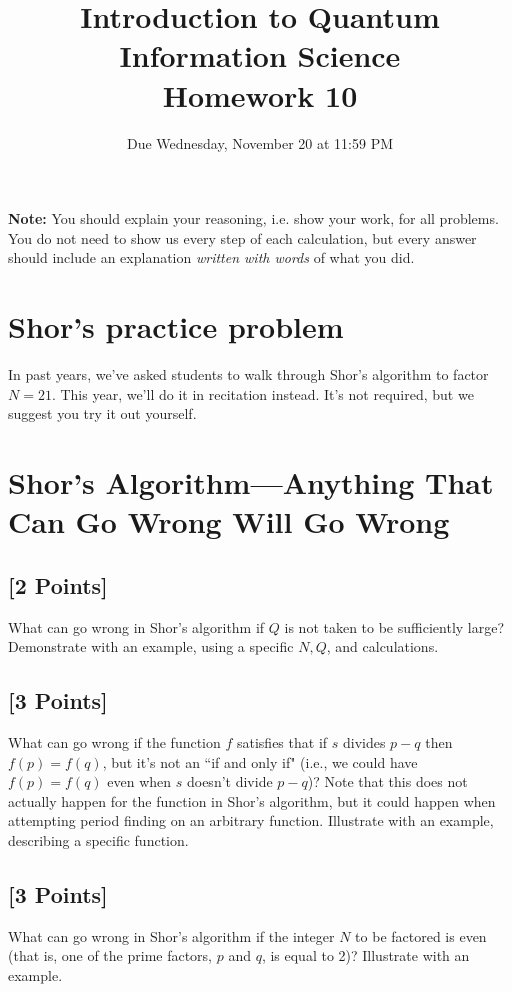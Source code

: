 \documentclass[11pt]{article}
\providecommand{\due}{Due Wednesday, November 20 at 11:59 PM}
\begin{document}
\title{Introduction to Quantum Information Science\\Homework 10}
\date{\due}

\maketitle

\textbf{Note:} You should explain your reasoning, i.e. show your work, for all problems. You do not need to show us every step of each calculation, but every answer should include an explanation \emph{written with words} of what you did.

\section*{Shor's practice problem}
In past years, we've asked students to walk through Shor's algorithm to factor $N=21$. This year, we'll do it in recitation instead. It's not required, but we suggest you try it out yourself.






\section{Shor's Algorithm---Anything That Can Go Wrong Will Go Wrong}

\subsection{[2 Points]} What can go wrong in Shor's algorithm if $Q$ is not taken to be
sufficiently large?  Demonstrate with an example, using a specific $N, Q$, and calculations.



\subsection{[3 Points]} What can go wrong if the function $f$
satisfies that if $s$ divides $p-q$ then $f(p)=f(q)$, but it's not an ``if and only if"
(i.e., we could have $f(p)=f(q)$ even when $s$ doesn't divide $p-q$)? Note that this does not actually happen for the function in Shor's algorithm, but it could happen when attempting period finding on an arbitrary function. Illustrate with an example, describing a specific function.



\subsection{[3 Points]} What can go wrong in Shor's algorithm if the integer $N$ to be factored is even (that is, one of the prime factors, $p$ and $q$, is equal to 2)?  Illustrate with an example.
\end{document}
